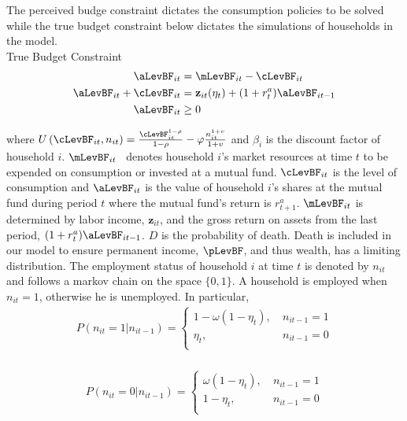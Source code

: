 \documentclass[titlepage]{\econtex}\providecommand{\texname}{Dissertation-Proposal}
\begin{document}
The perceived budge constraint dictates the consumption policies to be solved while the true budget constraint below dictates the simulations of households in the model.\\

True Budget Constraint \\ 
\begin{align*}
\aLevBF_{it}     &= \mLevBF_{it} - \cLevBF_{it}    \\
\aLevBF_{it} +\cLevBF_{it}    &= \mathbf{z}_{it}(\eta_{t}) +   (1 + r^{a}_{t} ) \aLevBF_{it-1} \\ 
\aLevBF_{it}  &\geq 0 \\
\end{align*}




where
$U\left(\cLevBF_{i t}, n_{i t}\right) = \frac{\cLevBF_{i t}^{1-\rho}}{1 -\rho} - \varphi \frac{n_{it}^{1+v}}{1+v}$  and $\beta_{i}$ is the discount factor of household $i$. $\mLevBF_{it}$ \ denotes household $i$'s market resources at time $t$ to be expended on consumption or invested at a mutual fund. $\cLevBF_{it}$ is the level of consumption and $ \aLevBF_{it}$ is the value of household $i$'s shares at the mutual fund during period $t$ where the mutual fund's return is $r_{t+1}^{a}$.  $\mLevBF_{it}$ is determined by labor income,  $\mathbf{z}_{it}$, and the gross return on assets from the last period, $(1+r_{t}^{a}) \aLevBF_{it-1} $. $D$ is the probability of death. Death is included in our model to ensure permanent income, $\pLevBF$, and thus wealth, has a limiting distribution. The employment status of household $i$ at time $t$ is denoted by $n_{it}$ and follows a markov chain on the space $\{0,1\}$.  A household is employed when $n_{it} = 1$, otherwise he is unemployed. In particular,\\

\begin{align*} 
P(n_{it} = 1 | n_{it-1}) = \begin{cases}
       1 - \omega(1-\eta_{t}),   & \ n_{it-1} = 1 \\
       \eta_{t},  &  \ n_{it-1} = 0 \\
    \end{cases}\\
\end{align*}


\begin{align*} 
P(n_{it} = 0 | n_{it-1}) = \begin{cases}
        \omega(1-\eta_{t}),   & \ n_{it-1} = 1 \\
       1- \eta_{t},  &  \ n_{it-1} = 0 \\
    \end{cases}\\
\end{align*}
\end{document}
